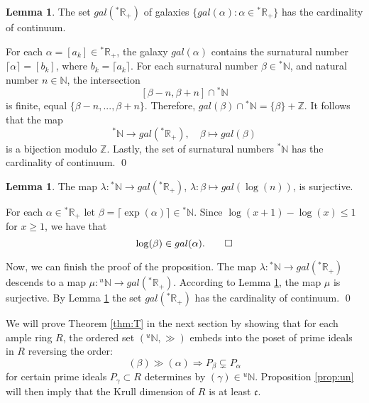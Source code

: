 \documentclass{amsproc}
\theoremstyle{definition}
\newtheorem{lemma}[theorem]{Lemma}
\theoremstyle{definition}
\theoremstyle{remark}
\begin{document}
\begin{lemma}\label{lem:cont}
The set $gal({{}^{*}{{\mathbb R}}}_+)$ of galaxies $\{gal({\alpha}): {\alpha}\in {{}^{*}{{\mathbb R}}}_+\}$ has the cardinality of continuum.
\end{lemma}
{\par\medskip{}} For each ${\alpha}=[a_k]\in {{}^{*}{{\mathbb R}}}_+$, the  galaxy $gal({\alpha})$ contains the surnatural number $\lceil {\alpha} \rceil= [ b_k]$, 
where $b_k=   \lceil a_k \rceil$. For each surnatural number ${\beta}\in {{}^{*}{{\mathbb N}}}$, and natural number $n\in {{\mathbb N}}$, the intersection
$$
[{\beta} -n, {\beta}+ n]\cap {{}^{*}{{\mathbb N}}}
$$
is finite, equal $\{{\beta} -n,..., {\beta} + n\}$. Therefore, $gal({\beta}) \cap {{}^{*}{{\mathbb N}}}= \{{\beta}\} + {{\mathbb Z}}$. It follows that the map 
$$
{{}^{*}{{\mathbb N}}} \to gal({{}^{*}{{\mathbb R}}}_+), \quad {\beta} \mapsto gal({\beta}) 
$$
is a bijection modulo ${{\mathbb Z}}$. Lastly, the set of surnatural numbers ${{}^{*}{{\mathbb N}}}$ has the cardinality of continuum. \qed 

\begin{lemma}\label{lem:surj}
The map $\lambda: {{}^{*}{{\mathbb N}}}\to gal({{}^{*}{{\mathbb R}}}_+)$, $\lambda: {\beta}\mapsto gal(\log(n))$,  is surjective. 
\end{lemma}
{\par\medskip{}} For each ${\alpha}\in {{}^{*}{{\mathbb R}}}_+$ let ${\beta} = \lceil \exp({\alpha}) \rceil \in {{}^{*}{{\mathbb N}}}$. Since $\log(x+1) -\log(x) \le 1$ for $x\ge 1$, we have that
$$
\log ({\beta}) \in  gal({\alpha}). \qed 
$$ 

Now, we can finish the proof of the proposition. The map ${\lambda}: {{}^{*}{{\mathbb N}}}\to gal({{}^{*}{{\mathbb R}}}_+)$ descends to a map $\mu: {{}^{u}{{\mathbb N}}}\to gal({{}^{*}{{\mathbb R}}}_+)$. According to Lemma \ref{lem:surj}, the map $\mu$ is surjective. By Lemma \ref{lem:cont}  the set  $gal({{}^{*}{{\mathbb R}}}_+)$ has the cardinality of continuum.  \qed 

\medskip 
We will prove Theorem \ref{thm:T} in the next section by showing that for each ample ring $R$, the ordered set 
$({{}^{u}{{\mathbb N}}}, \gg)$ embeds into the poset of prime ideals in $R$ reversing the order:
$$
({\beta}) \gg ({\alpha}) \Rightarrow P_\beta\subsetneq P_{\alpha}
$$
for certain prime ideals $P_{\gamma}\subset R$ determines by $({\gamma})\in {{}^{u}{{\mathbb N}}}$.  
Proposition \ref{prop:un} will then imply that the Krull dimension of $R$ is at least ${\mathfrak c}$. 
\end{document}

